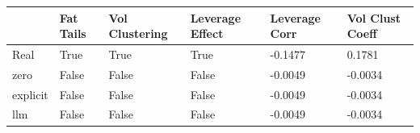 \begin{tabular}{llllll}
\toprule
 & Fat Tails & Vol Clustering & Leverage Effect & Leverage Corr & Vol Clust Coeff \\
\midrule
Real & True & True & True & -0.1477 & 0.1781 \\
zero & False & False & False & -0.0049 & -0.0034 \\
explicit & False & False & False & -0.0049 & -0.0034 \\
llm & False & False & False & -0.0049 & -0.0034 \\
\bottomrule
\end{tabular}
